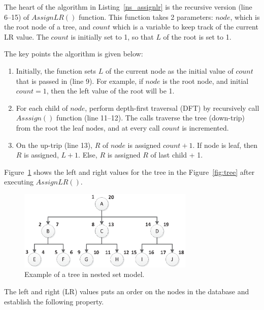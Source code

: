 The heart of the algorithm in Listing~\ref{ns_assignlr} is the recursive version (line 6--15) of $AssignLR()$ function. This function takes 2 parameters: $node$, which is the root node of a tree, and $count$ which is a variable to keep track of the current LR value. The $count$ is initially set to 1, so that $L$ of the root is set to 1.

The key points the algorithm is given below:

\begin{enumerate}
\item Initially, the function sets $L$ of the current node as the initial value of $count$ that is passed in (line 9). For example, if $node$ is the root node, and initial $count = 1$, then the left value of the root will be 1.
\item For each child of $node$, perform depth-first traversal (DFT) by recursively call $Asssign()$ function (line 11--12). The calls traverse the tree (down-trip) from the root the leaf nodes, and at every call $count$ is incremented.
\item On the up-trip (line 13), $R$ of $node$ is assigned $count + 1$. If node is leaf, then $R$ is assigned, $L + 1$. Else, $R$ is assigned $R$ of last child + 1.
\end{enumerate}

Figure~\ref{fig:tree-lr} shows the left and right values for the tree in the Figure~\ref{fig:tree} after executing $AssignLR()$.

\begin{figure}[!h]
\begin{center}
\includegraphics[width=3.3in]{images/tree-lr.eps}
\caption{Example of a tree in nested set model.\label{fig:tree-lr}}
\end{center}
\end{figure}

The left and right (LR) values puts an order on the nodes in the database and establish the following property.

